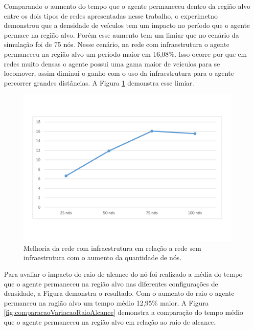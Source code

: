 Comparando o aumento do tempo que o agente permaneceu dentro da região alvo entre os dois tipos de redes apresentadas nesse trabalho, o experimetno demonstrou que a densidade de veículos tem um impacto no período que o agente permace na região alvo. Porém esse aumento tem um limiar que no cenário da simulação foi de 75 nós. Nesse cenário, na rede com infraestrutura o agente permaneceu na região alvo um período maior em 16,08\%. Isso ocorre por que em redes muito densas o agente possui uma gama maior de veículos para se locomover, assim diminui o ganho com o uso da infraestrutura para o agente percorrer grandes distâncias. A Figura \ref{fig:comparacaoMelhoriaComVariacaoNos} demonstra esse limiar.  

\begin{figure}[htbp]
	\centering
	\includegraphics[scale=0.34]{resultados/graficos/comparacaoMelhoriaComVariacaoNos.pdf}
	\caption{Melhoria da rede com infraestrutura em relação a rede sem infraestrutura com o aumento da quantidade de nós.}
	\label{fig:comparacaoMelhoriaComVariacaoNos}
\end{figure}

Para avaliar o impacto do raio de alcance do nó foi realizado a média do tempo que o agente permaneceu na região alvo nas diferentes configurações de densidade, a Figura demonstra o resultado. Com o aumento do raio o agente permanceu na ragião alvo um tempo médio 12,95\% maior. A Figura \ref{fig:comparacaoVariacaoRaioAlcance} demonstra a comparação do tempo médio que o agente permaneceu na região alvo em relação ao raio de alcance.

